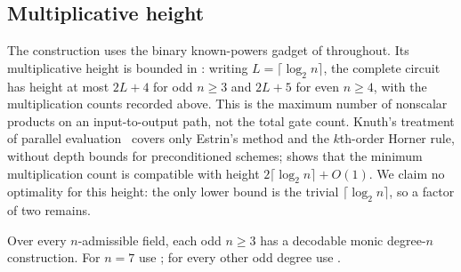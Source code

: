 \subsection*{Multiplicative height}

The construction uses the binary known-powers gadget of
 throughout.  Its multiplicative height is
bounded in : writing
$L=\lceil\log_2 n\rceil$, the complete circuit has height at most $2L+4$
for odd $n\ge3$ and $2L+5$ for even $n\ge4$, with the multiplication
counts recorded above.  This is the maximum number of nonscalar
products on an input-to-output path, not the total gate count.
Knuth's treatment of parallel evaluation~\cite[\S4.6.4]{knuth1997seminumerical}
covers only Estrin's method and the $k$th-order Horner rule, without depth
bounds for preconditioned schemes;  shows that
the minimum multiplication count is compatible with height
$2\lceil\log_2 n\rceil+O(1)$.  We claim no optimality for this height: the
only lower bound is the trivial $\lceil\log_2 n\rceil$, so a factor of two
remains.

\begin{corollary}
\label{cor:all-odd-decodable}
Over every $n$-admissible field, each odd $n\ge3$ has a decodable monic
degree-$n$ construction.  For $n=7$ use
; for every other odd degree use
.
\end{corollary}
